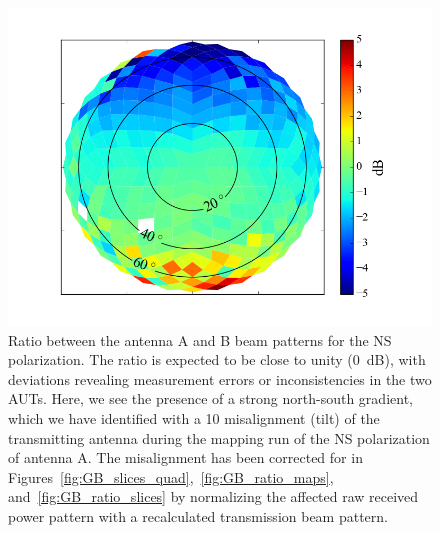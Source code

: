 \documentclass[preprint2,numberedappendix,tighten,twocolappendix]{aastex6}
\begin{document}
\begin{figure}
\includegraphics[width=\columnwidth]{figures/GB_NS_ratio_uncalibrated.png}
\caption{Ratio between the antenna A and B beam patterns for the NS polarization.  The ratio is expected to be close to unity (0~dB), with deviations revealing measurement errors or inconsistencies in the two AUTs. Here, we see the presence of a strong north-south gradient, which we have identified with a 10\arcdeg{} misalignment (tilt) of the transmitting antenna during the mapping run of the NS polarization of antenna A.  The misalignment has been corrected for in Figures~\ref{fig:GB_slices_quad},~\ref{fig:GB_ratio_maps}, and~\ref{fig:GB_ratio_slices} by normalizing the affected raw received power pattern with a recalculated transmission beam pattern. }\label{fig:GB_NS_ratio_uncalibrated}
\end{figure}
\end{document}
